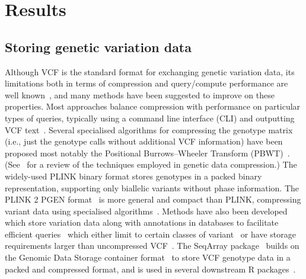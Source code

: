 \documentclass[a4paper,num-refs]{oup-contemporary}
\begin{document}
\section{Results}

\subsection{Storing genetic variation data}
Although VCF is the standard format for exchanging genetic variation
data, its limitations both in terms of compression
and query/compute performance are well
known~\citep[e.g.][]{kelleher2013processing,layer2016efficient,li2016bgt},
and many methods
have been suggested to improve on these properties.
Most approaches balance compression with
performance on particular types of queries,
typically using a command line interface (CLI)
and outputting VCF text~\citep{
layer2016efficient, %
li2016bgt, %
tatwawadi2016gtrac, %
danek2018gtc, %
lin2020sparse, %
lan2020genozip,lan2021genozip, %
lefaive2021sparse, %
wertenbroek2022xsi,%
zhang2023gbc}. %
Several specialised algorithms for compressing
the genotype matrix (i.e., just the genotype calls without additional
VCF information) have been proposed
\citep{qiao2012handling, %
deorowicz2013genome, %
sambo2014compression, %
deorowicz2019gtshark, %
deorowicz2021vcfshark, %
dehaas2024genotype} %
most notably the Positional
Burrows--Wheeler Transform (PBWT)~\citep{durbin2014efficient}.
(See~\citep{mcvean2019linkage} for a review of the techniques
employed in genetic data compression.)
The widely-used PLINK binary format stores genotypes in a
packed binary representation, supporting only biallelic
variants without phase information.
The PLINK 2 PGEN format~\citep{rivas2024efficient} is more general
and compact than PLINK, compressing variant data using specialised
algorithms~\cite{sambo2014compression}.
Methods have also been developed which store variation data
along with annotations in databases to facilitate
efficient queries~\cite[e.g.][]{
paila2013gemini,%
lopez2017hgva} %
which either limit to certain classes of variant~\cite[e.g.][]{greene2023genetic}
or have storage requirements larger
than uncompressed VCF~\citep{al2023critical}.
The SeqArray package~\citep{zheng2017seqarray} builds on the
Genomic Data Storage container format~\cite{zheng2012high}
to store VCF genotype data in a packed and compressed format,
and is used in several downstream R packages~\cite[e.g.][]{
gogarten2019genetic,fernandes2020simplephenotypes}.
\end{document}
